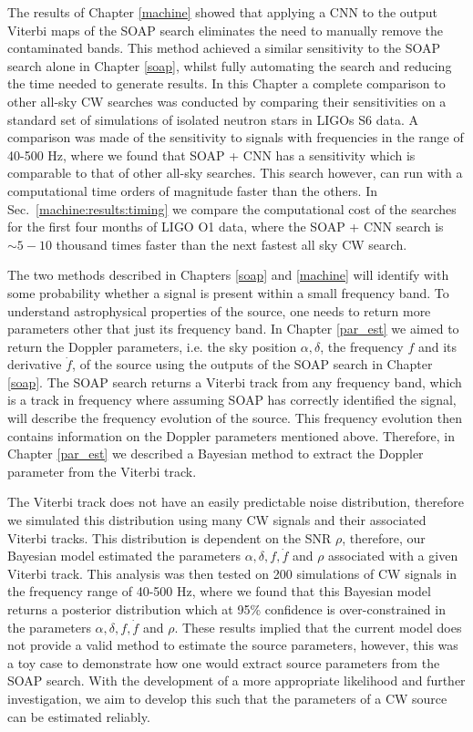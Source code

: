 The results of Chapter \ref{machine} showed that applying a \gls{CNN} to the output
Viterbi maps of the SOAP search eliminates the need to manually remove the
contaminated bands.  This method achieved a similar sensitivity to the SOAP
search alone in Chapter \ref{soap}, whilst fully automating the search and
reducing the time needed to generate results.  In this Chapter a complete
comparison to other all-sky \gls{CW}
searches was conducted by comparing their sensitivities on a standard set of
simulations of isolated neutron stars in \glspl{LIGO} S6 data.  A comparison
was made of the sensitivity to signals with frequencies in the range of 40-500
Hz, where we found that SOAP + \gls{CNN} has a sensitivity which is comparable to that of other all-sky searches.
This search however, can run with a computational time orders of magnitude
faster than the others. In Sec.~\ref{machine:results:timing} we
compare the computational cost of the searches for the first four months of
\gls{LIGO} O1 data, where the SOAP + \gls{CNN} search is $\sim 5 - 10$ thousand
times faster than the next fastest all sky \gls{CW} search.

\bigskip

The two methods described in Chapters \ref{soap} and \ref{machine} will
identify with some probability whether a signal is present within a small
frequency band.  To understand astrophysical properties of the source, one
needs to return more parameters other that just its frequency band.  In Chapter
\ref{par_est} we aimed to return the Doppler parameters, i.e. the sky position
$\alpha, \delta$, the frequency $f$ and its derivative $\dot{f}$, of the source
using the outputs of the SOAP search in Chapter \ref{soap}.  The SOAP search
returns a Viterbi track from any frequency band, which is a track in frequency
where assuming SOAP has correctly identified the signal, will describe the
frequency evolution of the source.  This frequency evolution then contains
information on the Doppler parameters mentioned above.  Therefore, in Chapter
\ref{par_est} we described a Bayesian method to extract the Doppler parameter
from the Viterbi track.

The Viterbi track does not have an easily predictable noise distribution,
therefore we simulated this distribution using many \gls{CW} signals and their
associated Viterbi tracks.  This distribution is dependent on the \gls{SNR}
$\rho$, therefore, our Bayesian model estimated the parameters $\alpha, \delta,
f, \dot{f}$ and $\rho$ associated with a given Viterbi track.  This analysis
was then tested on 200 simulations of \gls{CW} signals in the frequency range
of 40-500 Hz, where we found that this Bayesian model returns a posterior
distribution which at 95\% confidence is over-constrained in the parameters
$\alpha,\delta,f,\dot{f}$ and $\rho$.  These results implied that the current
model does not provide a valid method to estimate the source parameters,
however, this was a toy case to demonstrate how one would extract source
parameters from the SOAP search.  With the development of a more appropriate
likelihood and further investigation, we aim to develop this such that the
parameters of a \gls{CW} source can be estimated reliably.

